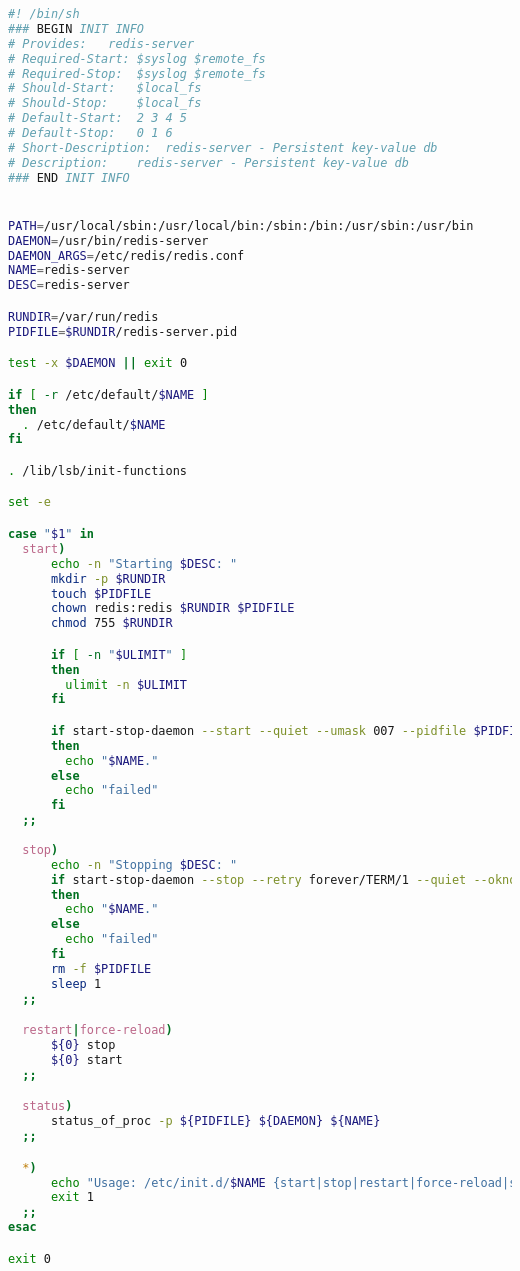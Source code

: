\begin{lstlisting}[language=Bash, caption=Redis Server Service]
#! /bin/sh
### BEGIN INIT INFO
# Provides:   redis-server
# Required-Start: $syslog $remote_fs
# Required-Stop:  $syslog $remote_fs
# Should-Start:   $local_fs
# Should-Stop:    $local_fs
# Default-Start:  2 3 4 5
# Default-Stop:   0 1 6
# Short-Description:  redis-server - Persistent key-value db
# Description:    redis-server - Persistent key-value db
### END INIT INFO


PATH=/usr/local/sbin:/usr/local/bin:/sbin:/bin:/usr/sbin:/usr/bin
DAEMON=/usr/bin/redis-server
DAEMON_ARGS=/etc/redis/redis.conf
NAME=redis-server
DESC=redis-server

RUNDIR=/var/run/redis
PIDFILE=$RUNDIR/redis-server.pid

test -x $DAEMON || exit 0

if [ -r /etc/default/$NAME ]
then
  . /etc/default/$NAME
fi

. /lib/lsb/init-functions

set -e

case "$1" in
  start)
      echo -n "Starting $DESC: "
      mkdir -p $RUNDIR
      touch $PIDFILE
      chown redis:redis $RUNDIR $PIDFILE
      chmod 755 $RUNDIR

      if [ -n "$ULIMIT" ]
      then
        ulimit -n $ULIMIT
      fi

      if start-stop-daemon --start --quiet --umask 007 --pidfile $PIDFILE --chuid redis:redis --exec $DAEMON -- $DAEMON_ARGS
      then
        echo "$NAME."
      else
        echo "failed"
      fi
  ;;
  
  stop)
      echo -n "Stopping $DESC: "
      if start-stop-daemon --stop --retry forever/TERM/1 --quiet --oknodo --pidfile $PIDFILE --exec $DAEMON
      then
        echo "$NAME."
      else
        echo "failed"
      fi
      rm -f $PIDFILE
      sleep 1
  ;;

  restart|force-reload)
      ${0} stop
      ${0} start
  ;;

  status)
      status_of_proc -p ${PIDFILE} ${DAEMON} ${NAME}
  ;;

  *)
      echo "Usage: /etc/init.d/$NAME {start|stop|restart|force-reload|status}" >&2
      exit 1
  ;;
esac

exit 0
\end{lstlisting}